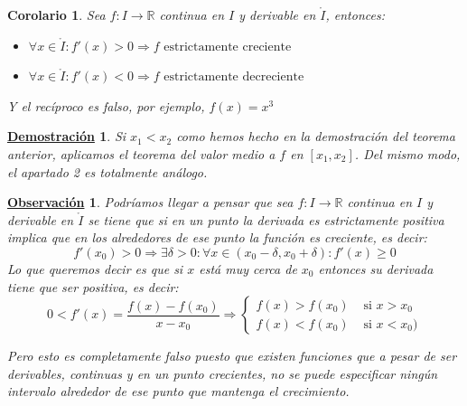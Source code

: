 \documentclass[10pt,a4paper,openright]{book}
\theoremstyle{break}
\newtheorem{coro}{Corolario}[theo]
\newtheorem*{demo}{\underline{Demostración}}
\newtheorem{obs}{\underline{Observación}}[chapter]
\begin{document}
\begin{coro}
Sea $f:I\rightarrow\mathbb R$ continua en $I$ y derivable en $\mathring{I}$, entonces:
\begin{itemize}
\item $\forall x\in \mathring{I}: f'(x)>0\Rightarrow f\mbox{ estrictamente creciente}$
\item $\forall x\in \mathring{I}: f'(x)<0\Rightarrow f\mbox{ estrictamente decreciente}$
\end{itemize}
Y el recíproco es falso, por ejemplo, $f(x)=x^3$
\end{coro}
\begin{demo}
Si $x_1<x_2$ como hemos hecho en la demostración del teorema anterior, aplicamos el teorema del valor medio a $f$ en $[x_1,x_2]$. Del mismo modo, el apartado 2 es totalmente análogo.
\end{demo}

\begin{obs}
Podríamos llegar a pensar que sea $f:I\rightarrow\mathbb R$ continua en $I$ y derivable en $\mathring{I}$ se tiene que si en un punto la derivada es estrictamente positiva implica que en los alrededores de ese punto la función es creciente, es decir:
$$f'(x_0)>0\Rightarrow \exists \delta>0: \forall x\in (x_0-\delta, x_0+\delta): f'(x)\geq 0$$
Lo que queremos decir es que si $x$ está muy cerca de $x_0$ entonces su derivada tiene que ser positiva, es decir:
$$0<f'(x)=\frac{f(x)-f(x_0)}{x-x_0}\Rightarrow\begin{cases}f(x)>f(x_0) & \mbox{ si }x>x_0\\ f(x)<f(x_0) & \mbox{ si }x<x_0)\end{cases}$$

Pero esto es completamente falso puesto que existen funciones que a pesar de ser derivables, continuas y en un punto crecientes, no se puede especificar ningún intervalo alrededor de ese punto que mantenga el crecimiento.
\end{obs}
\end{document}
